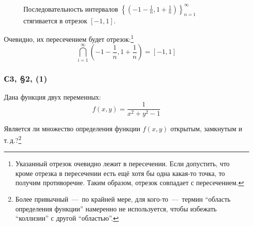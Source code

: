\documentclass[a4paper,12pt]{article}
\begin{document}
\begin{solution}
\begin{figure}[ht]
      \caption{
        Последовательность интервалов $\left\{
          \left(-1 - \frac{1}{n}, 1 + \frac{1}{n}\right)
        \right\}_{n = 1}^{\infty}$ стягивается в отрезок $[-1, 1]$.
      }
      \label{fig:intersection-of-inf-number-opens}
    \end{figure}

    Очевидно, их пересечением будет отрезок:\footnote{
      Указанный отрезок очевидно лежит в пересечении.
      Если допустить, что кроме отрезка в пересечении есть ещё хотя бы одна какая-то точка, то получим противоречие.
      Таким образом, отрезок совпадает с пересечением.
    }
    \[
      \bigcap_{i = 1}^\infty \left(-1 - \frac{1}{n}, 1 + \frac{1}{n}\right) = [-1, 1]
    \]
  \end{solution}


  \subsubsection{С3, \S 2, (1)}

  Дана функция двух переменных:
  \[
    f(x, y) = \frac{1}{x^2 + y^2 - 1}
  \]
  
  Является ли множество определения функции $f(x, y)$ открытым, замкнутым и т.\,д.?\footnote{
    Более привычный~---~по крайней мере, для кого-то~---~термин ``область определения функции'' намеренно не используется, чтобы избежать ``коллизии'' с другой ``областью''.
  }
  
\end{document}
